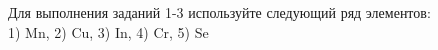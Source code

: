 Для выполнения заданий 1-3 используйте следующий ряд элементов: \\
1) Mn, 2) Cu, 3) In, 4) Cr, 5) Se 			
